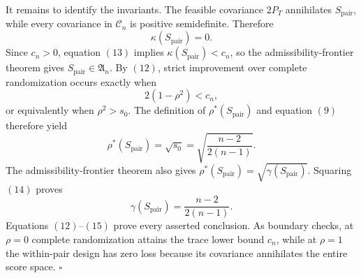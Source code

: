 It remains to identify the invariants.  The feasible covariance \(2P_T\) annihilates \(S_{\mathrm{pair}}\), while every covariance in \(\mathcal C_n\) is positive semidefinite.  Therefore
\[
\kappa(S_{\mathrm{pair}})=0.
\tag{13}
\]
Since \(c_n>0\), equation \((13)\) implies \(\kappa(S_{\mathrm{pair}})<c_n\), so the admissibility-frontier theorem gives \(S_{\mathrm{pair}}\in\mathfrak A_n\).  By \((12)\), strict improvement over complete randomization occurs exactly when
\[
2(1-\rho^2)<c_n,
\]
or equivalently when \(\rho^2>s_0\).  The definition of \(\rho^*(S_{\mathrm{pair}})\) and equation \((9)\) therefore yield
\[
\rho^*(S_{\mathrm{pair}})=\sqrt{s_0}
=\sqrt{\frac{n-2}{2(n-1)}}.
\tag{14}
\]
The admissibility-frontier theorem also gives \(\rho^*(S_{\mathrm{pair}})=\sqrt{\gamma(S_{\mathrm{pair}})}\).  Squaring \((14)\) proves
\[
\gamma(S_{\mathrm{pair}})=\frac{n-2}{2(n-1)}.
\tag{15}
\]
Equations \((12)\)--\((15)\) prove every asserted conclusion.  As boundary checks, at \(\rho=0\) complete randomization attains the trace lower bound \(c_n\), while at \(\rho=1\) the within-pair design has zero loss because its covariance annihilates the entire score space.  \(\square\)